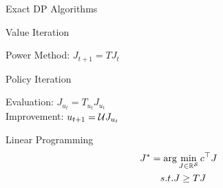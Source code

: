 \documentclass[10pt,handout]{beamer}
\begin{document}
\begin{frame}[fragile]{Exact DP Algorithms}
\begin{block}{Value Iteration}
\begin{center}
Power Method: $J_{t+1}=T J_t$
\end{center}
\end{block}
\begin{block}{Policy Iteration}
\begin{center}
Evaluation: $J_{u_t}=T_{u_t} J_{u_t}$\\
Improvement: $u_{t+1}=\mathcal{U} J_{u_t}$
\end{center}
\end{block}

\begin{block}{Linear Programming}
\begin{align*}
J^*&=\arg\min_{J\in \mathbb{R}^{\mathcal{S}}} c^\top J\\
&\quad s.t. J\geq TJ
\end{align*}
\end{block}
\end{frame}
\end{document}
